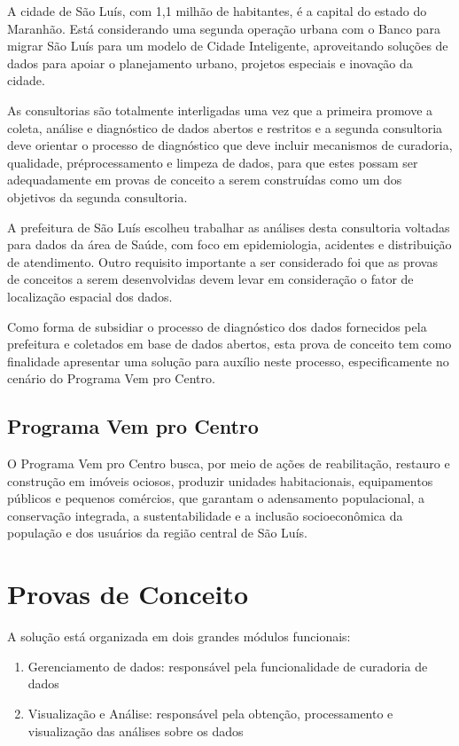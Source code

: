 \documentclass[letterpaper,10pt,brazil]{sphinxmanual}
\begin{document}
\sphinxAtStartPar
A cidade de São Luís, com 1,1 milhão de habitantes, é a capital do estado do Maranhão. Está considerando uma segunda operação urbana com o Banco para migrar São Luís para um modelo de Cidade Inteligente, aproveitando soluções de dados para apoiar o planejamento urbano, projetos especiais e inovação da cidade.

\sphinxAtStartPar
As consultorias são totalmente interligadas uma vez que a primeira promove a coleta, análise e diagnóstico de dados abertos e restritos e a segunda consultoria deve orientar o processo de diagnóstico que deve incluir mecanismos de curadoria, qualidade, pré\sphinxhyphen{}processamento e limpeza de dados, para que estes possam ser adequadamente em provas de conceito a serem construídas como um dos objetivos da segunda consultoria.

\sphinxAtStartPar
A prefeitura de São Luís escolheu trabalhar as análises desta consultoria voltadas para dados da área de Saúde, com foco em epidemiologia, acidentes e distribuição de atendimento. Outro requisito importante a ser considerado foi que as provas de conceitos a serem desenvolvidas devem levar em consideração o fator de localização espacial dos dados.

\sphinxAtStartPar
Como forma de subsidiar o processo de diagnóstico dos dados fornecidos pela prefeitura e coletados em base de dados abertos, esta prova de conceito tem como finalidade apresentar uma solução para auxílio neste processo, especificamente no cenário do Programa Vem pro Centro.


\section{Programa Vem pro Centro}
\label{\detokenize{sobre:programa-vem-pro-centro}}
\sphinxAtStartPar
O Programa Vem pro Centro busca, por meio de ações de reabilitação, restauro e construção em imóveis ociosos, produzir unidades habitacionais, equipamentos públicos e pequenos comércios, que garantam o adensamento populacional, a conservação integrada, a sustentabilidade e a inclusão socioeconômica da população e dos usuários da região central de São Luís.

\sphinxstepscope


\chapter{Provas de Conceito}
\label{\detokenize{pdc:provas-de-conceito}}\label{\detokenize{pdc::doc}}
\sphinxAtStartPar
A solução está organizada em dois grandes módulos funcionais:
\begin{enumerate}
%
\item {} 
\sphinxAtStartPar
Gerenciamento de dados: responsável pela funcionalidade de curadoria de dados

\item {} 
\sphinxAtStartPar
Visualização e Análise: responsável pela obtenção, processamento e visualização das análises sobre os dados

\end{enumerate}
\end{document}

